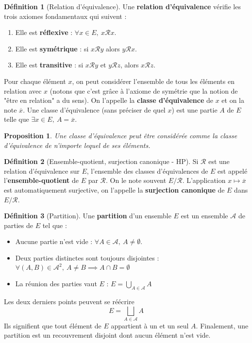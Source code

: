 \documentclass[french]{book}
\theoremstyle{plain}
\newtheorem{prop}{Proposition}[chapter]
\theoremstyle{definition}
\newtheorem{dfn}{Définition}[chapter]
\theoremstyle{remark}
\begin{document}
\begin{dfn}[Relation d'équivalence]
	Une \textbf{relation d'équivalence} vérifie les trois axiomes fondamentaux qui suivent :
	\begin{enumerate}
		\item Elle est \textbf{réflexive} : $\forall x\in E,\ x\mathcal{R}x$.
		\item Elle est \textbf{symétrique} : si $x\mathcal{R}y$ alors $y\mathcal{R}x$.
		\item Elle est \textbf{transitive} : si $x\mathcal{R}y$ et $y\mathcal{R}z$, alors $x\mathcal{R}z$.
	\end{enumerate}
	Pour chaque élément $x$, on peut considérer l'ensemble de tous les éléments en relation avec $x$ (notons que c'est grâce à l'axiome de symétrie que la notion de "être en relation" a du sens). On l'appelle la \textbf{classe d'équivalence} de $x$ et on la note $\overline{x}$. Une classe d'équivalence (sans préciser de quel $x$) est une partie $A$ de $E$ telle que $\exists x\in E,\ A=\overline{x}$.
\end{dfn}
\begin{prop}
	Une classe d'équivalence peut être considérée comme la classe d'équivalence de n'importe lequel de ses éléments.
\end{prop}
\begin{dfn}[Ensemble-quotient, surjection canonique - HP]
	Si $\mathcal{R}$ est une relation d'équivalence sur $E$, l'ensemble des classes d'équivalences de $E$ est appelé l'\textbf{ensemble-quotient} de $E$ par $\mathcal{R}$. On le note souvent $E/\mathcal{R}$. L'application $x\mapsto\overline{x}$ est automatiquement surjective, on l'appelle la \textbf{surjection canonique} de $E$ dans $E/\mathcal{R}$.
\end{dfn}
\begin{dfn}[Partition]
	Une \textbf{partition} d'un ensemble $E$ est un ensemble $\mathcal{A}$ de parties de $E$ tel que  :
	\begin{itemize}
		\item Aucune partie n'est vide : $\forall A\in\mathcal{A},\ A\ne\emptyset$.
		\item Deux parties distinctes sont toujours disjointes : $\forall(A,B)\in\mathcal{A}^2,\ A\ne B\implies A\cap B=\emptyset$
		\item La réunion des parties vaut $E$ : $\displaystyle E=\bigcup_{A\in \mathcal{A}} A$
	\end{itemize}
	Les deux derniers points peuvent se réécrire $$E=\bigsqcup_{A\in\mathcal{A}}A$$ Ils signifient que tout élément de $E$ appartient à un et un seul $A$. Finalement, une partition est un recouvrement disjoint dont aucun élément n'est vide.
\end{dfn}
\end{document}

